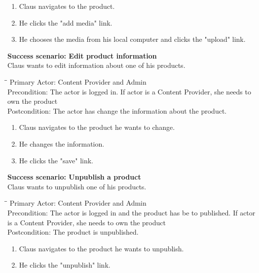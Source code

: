 \begin{enumerate} \setlength{\itemsep}{-1mm}
	\item Claus navigates to the product.
	\item He clicks the "add media" link.
	\item He chooses the media from his local computer and clicks the "upload" link.
\end{enumerate}
\vspace{3mm}
\textbf{Success scenario: Edit product information} \\
Claus wants to edit information about one of his products.
\begin{tabbing}
\hspace{5mm}\=\hspace{26mm}\=\kill
\>Primary Actor:\> Content Provider and Admin\\
\>Precondition:\> The actor is logged in. If actor is a Content Provider, she needs to own the product\\
\>Postcondition:\> The actor has change the information about the product.
\end{tabbing}
\begin{enumerate} \setlength{\itemsep}{-1mm}
	\item Claus navigates to the product he wants to change.
	\item He changes the information.
	\item He clicks the "save" link.
\end{enumerate}
\vspace{3mm}
\textbf{Success scenario: Unpublish a product} \\
Claus wants to unpublish one of his products.
\begin{tabbing}
\hspace{5mm}\=\hspace{26mm}\=\kill
\>Primary Actor:\> Content Provider and Admin\\
\>Precondition:\> The actor is logged in and the product has be to published. If actor is a Content Provider, she needs to own the product\\
\>Postcondition:\> The product is unpublished.
\end{tabbing}
\begin{enumerate} \setlength{\itemsep}{-1mm}
	\item Claus navigates to the product he wants to unpublish.
	\item He clicks the "unpublish" link.
\end{enumerate}
